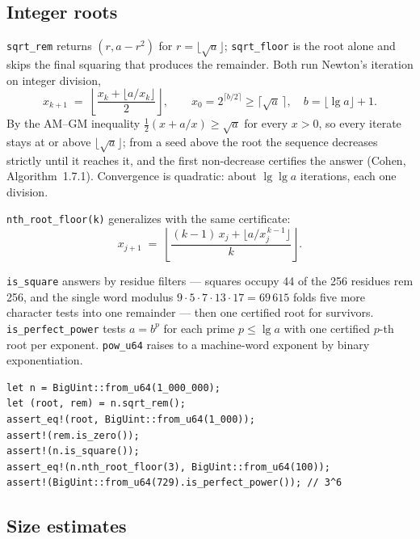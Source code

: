 \documentclass[11pt]{article}
\newcommand{\code}[1]{\texttt{#1}}
\begin{document}
\subsection{Integer roots}
\label{sec:roots}

\code{sqrt\_rem} returns $(r, a - r^2)$ for $r = \lfloor \sqrt{a} \rfloor$;
\code{sqrt\_floor} is the root alone and skips the final squaring that
produces the remainder. Both run Newton's iteration on integer division,
\begin{equation}
x_{k+1} \;=\; \left\lfloor \frac{x_k + \lfloor a / x_k \rfloor}{2} \right\rfloor,
\qquad x_0 = 2^{\lceil b/2 \rceil} \ge \lceil\sqrt{a}\,\rceil,
\quad b = \lfloor \lg a \rfloor + 1 .
\end{equation}
By the AM--GM inequality $\tfrac12 (x + a/x) \ge \sqrt{a}$ for every
$x > 0$, so every iterate stays at or above $\lfloor\sqrt{a}\rfloor$; from a
seed above the root the sequence decreases strictly until it reaches it,
and the first non-decrease certifies the answer (Cohen, Algorithm~1.7.1).
Convergence is quadratic: about $\lg \lg a$ iterations, each one division.

\code{nth\_root\_floor(k)} generalizes with the same certificate:
\begin{equation}
x_{j+1} \;=\; \left\lfloor
\frac{(k-1)\,x_j + \lfloor a / x_j^{\,k-1} \rfloor}{k}
\right\rfloor .
\end{equation}

\code{is\_square} answers by residue filters --- squares occupy 44 of the
256 residues rem 256, and the single word modulus
$9 \cdot 5 \cdot 7 \cdot 13 \cdot 17 = 69\,615$ folds five more character
tests into one remainder --- then one certified root for survivors.
\code{is\_perfect\_power} tests $a = b^p$ for each prime $p \le \lg a$ with
one certified $p$-th root per exponent. \code{pow\_u64} raises to a
machine-word exponent by binary exponentiation.

\begin{lstlisting}
let n = BigUint::from_u64(1_000_000);
let (root, rem) = n.sqrt_rem();
assert_eq!(root, BigUint::from_u64(1_000));
assert!(rem.is_zero());
assert!(n.is_square());
assert_eq!(n.nth_root_floor(3), BigUint::from_u64(100));
assert!(BigUint::from_u64(729).is_perfect_power()); // 3^6
\end{lstlisting}

\subsection{Size estimates}
\end{document}
